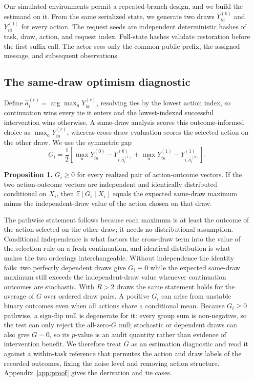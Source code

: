 \documentclass{article}
\begin{document}
Our simulated environments permit a repeated-branch design, and we build the estimand on it. From the same serialized state, we generate two draws $Y_{ia}^{(0)}$ and $Y_{ia}^{(1)}$ for every action. The request seeds are independent deterministic hashes of task, draw, action, and request index. Full-state hashes validate restoration before the first suffix call. The actor sees only the common public prefix, the assigned message, and subsequent observations.

\subsection{The same-draw optimism diagnostic}

Define $\widehat a_i^{(r)}=\arg\max_a Y_{ia}^{(r)}$, resolving ties by the lowest action index, so continuation wins every tie it enters and the lowest-indexed successful intervention wins otherwise. A same-draw analysis scores this outcome-informed choice as $\max_aY_{ia}^{(r)}$, whereas cross-draw evaluation scores the selected action on the other draw. We use the symmetric gap
\begin{equation}
G_i=\frac{1}{2}\!\left[
\max_aY_{ia}^{(0)}-Y_{i,\widehat a_i^{(1)}}^{(0)}+
\max_aY_{ia}^{(1)}-Y_{i,\widehat a_i^{(0)}}^{(1)}
\right].
\label{eq:gap}
\end{equation}

\textbf{Proposition 1.} $G_i\geq0$ for every realized pair of action-outcome vectors. If the two action-outcome vectors are independent and identically distributed conditional on $X_i$, then $\mathbb{E}[G_i\mid X_i]$ equals the expected same-draw maximum minus the independent-draw value of the action chosen on that draw.

The pathwise statement follows because each maximum is at least the outcome of the action selected on the other draw; it needs no distributional assumption. Conditional independence is what factors the cross-draw term into the value of the selection rule on a fresh continuation, and identical distribution is what makes the two orderings interchangeable. Without independence the identity fails: two perfectly dependent draws give $G_i\equiv0$ while the expected same-draw maximum still exceeds the independent-draw value whenever continuation outcomes are stochastic. With $R>2$ draws the same statement holds for the average of $G$ over ordered draw pairs. A positive $G_i$ can arise from unstable binary outcomes even when all actions share a conditional mean. Because $G_i\geq0$ pathwise, a sign-flip null is degenerate for it: every group sum is non-negative, so the test can only reject the all-zero-$G$ null; stochastic or dependent draws can also give $G=0$, so its $p$-value is an audit quantity rather than evidence of intervention benefit. We therefore treat $G$ as an estimation diagnostic and read it against a within-task reference that permutes the action and draw labels of the recorded outcomes, fixing the noise level and removing action structure. Appendix~\ref{app:proof} gives the derivation and tie cases.
\end{document}
